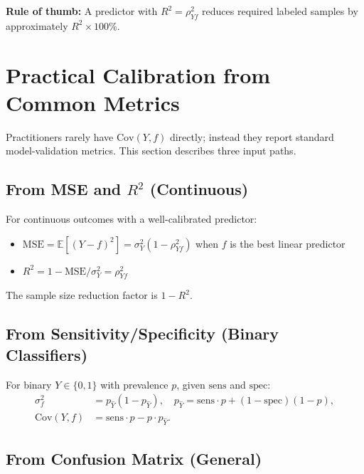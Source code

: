 \documentclass[11pt]{article}
\newcommand{\E}{\mathbb{E}}
\newcommand{\Cov}{\mathrm{Cov}}
\begin{document}
\begin{tcolorbox}
\textbf{Rule of thumb:} A predictor with $R^2 = \rho_{Yf}^2$ reduces
required labeled samples by approximately $R^2 \times 100\%$.
\end{tcolorbox}

\section{Practical Calibration from Common Metrics}
\label{sec:calibration}

Practitioners rarely have $\Cov(Y,f)$ directly; instead they report
standard model-validation metrics.  This section describes three
input paths.

\subsection{From MSE and $R^2$ (Continuous)}

For continuous outcomes with a well-calibrated predictor:
\begin{itemize}
  \item $\text{MSE} = \E[(Y-f)^2] = \sigma_Y^2(1-\rho_{Yf}^2)$ when
    $f$ is the best linear predictor
  \item $R^2 = 1 - \text{MSE}/\sigma_Y^2 = \rho_{Yf}^2$
\end{itemize}
The sample size reduction factor is $1 - R^2$.

\subsection{From Sensitivity/Specificity (Binary Classifiers)}

For binary $Y \in \{0,1\}$ with prevalence $p$, given
$\mathrm{sens}$ and $\mathrm{spec}$:
\begin{align}
\sigma_f^2 &= p_{\hat Y}(1-p_{\hat Y}), \quad
  p_{\hat Y} = \mathrm{sens}\cdot p + (1-\mathrm{spec})(1-p), \\
\Cov(Y,f) &= \mathrm{sens}\cdot p - p\cdot p_{\hat Y}.
\end{align}

\subsection{From Confusion Matrix (General)}
\end{document}
